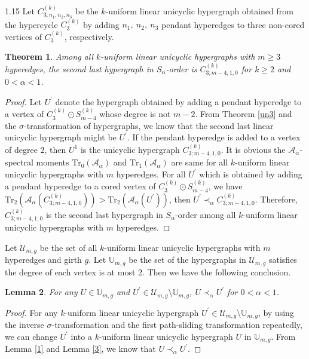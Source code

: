 \documentclass[preprint,12pt]{elsarticle1}
\newtheorem{thm}{Theorem}[section]
\newtheorem{lem}[thm]{Lemma}
\numberwithin{equation}{section}
\begin{document}
\begin{spacing}{1.15}
Let $C^{(k)}_{3;n_1,n_2,n_3}$ be the $k$-uniform linear unicyclic hypergraph obtained from the hypercycle $C_{3}^{(k)}$ by adding $n_1,~ n_2,~ n_3$ pendant hyperedges to three non-cored vertices of $C_{3}^{(k)}$, respectively.

\begin{thm}\label{2ndUm}
Among all $k$-uniform linear unicyclic hypergraphs with $m\ge3$ hyperedges, the second last hypergraph in $S_{\alpha}$-order is $C^{(k)}_{3;m-4,1,0}$ for $k\ge2$ and $0<\alpha<1$.
\end{thm}

\begin{proof}
Let $U^{'}$ denote the hypergraph obtained by adding a pendant hyperedge to a vertex of $C_{3}^{(k)}\odot S_{m-4}^{(k)}$ whose degree is not $m-2$.
From Theorem \ref{un3} and the $\sigma$-transformation of hypergraphs, we know that the second last linear unicyclic hypergraph might be $U^{'}$.
If the pendant hyperedge is added to a vertex of degree $2$, then $U^{1}$ is the unicyclic hypergraph $C^{(k)}_{3;m-4,1,0}$.
It is obvious the $\mathcal{A}_{\alpha}$-spectral moments $\mathrm{Tr}_0(\mathcal{A}_{\alpha})$ and $\mathrm{Tr}_1(\mathcal{A}_{\alpha})$ are same for all $k$-uniform linear unicyclic hypergraphs with $m$ hyperedges.
For all $U^{'}$ which is obtained by adding a pendant hyperedge to a cored vertex of $C_{3}^{(k)}\odot S_{m-4}^{(k)}$, we have $\mathrm{Tr}_{2}(\mathcal{A}_{\alpha}(C^{(k)}_{3;m-4,1,0}))>\mathrm{Tr}_{2}(\mathcal{A}_{\alpha}(U^{'}))$, then $U^{'}\prec_{\alpha}C^{(k)}_{3;m-4,1,0}$. Therefore, $C^{(k)}_{3;m-4,1,0}$ is the second last hypergraph in $S_{\alpha}$-order among all $k$-uniform linear unicyclic hypergraphs with $m$ hyperedges.
\end{proof}

Let $\mathcal{U}_{m,g}$ be the set of all $k$-uniform linear unicyclic hypergraphs with $m$ hyperedges and girth $g$.
Let $\mathbb{U}_{m,g}$ be the set of the hypergraphs in $\mathcal{U}_{m,g}$ satisfies the degree of each vertex is at most 2.
Then we have the following conclusion.

\begin{lem}\label{Uu}
For any $U\in\mathbb{U}_{m,g}$ and $U^{'}\in\mathcal{U}_{m,g}\setminus\mathbb{U}_{m,g}$, $U\prec_{\alpha}U^{'}$ for $0<\alpha<1$.
\end{lem}

\begin{proof}
For any $k$-uniform linear unicyclic hypergraph $U^{'}\in\mathcal{U}_{m,g}\setminus\mathbb{U}_{m,g}$, by using the inverse $\sigma$-transformation and the first path-sliding transformation repeatedly, we can change $U^{'}$ into a $k$-uniform linear unicyclic hypergraph $U$ in $\mathbb{U}_{m,g}$.
From Lemma \ref{1} and Lemma \ref{3}, we know that $U\prec_{\alpha}U^{'}$.
\end{proof}


\end{spacing}
\end{document}
